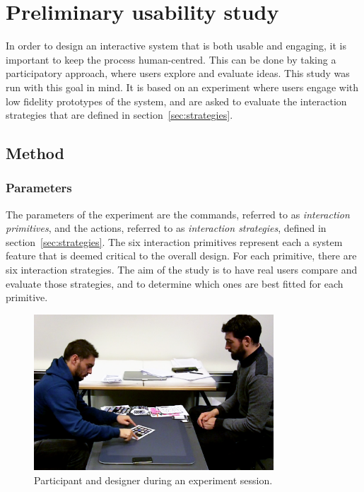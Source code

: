 \section{Preliminary usability study}

In order to design an interactive system that is both usable and engaging, it is important to keep the process human-centred.
This can be done by taking a participatory approach, where users explore and evaluate ideas.
This study was run with this goal in mind.
It is based on an experiment where users engage with low fidelity prototypes of the system, and are asked to evaluate the interaction strategies that are defined in section~\ref{sec:strategies}.

\subsection{Method}	

\subsubsection{Parameters}

The parameters of the experiment are the commands, referred to as \emph{interaction primitives}, and the actions, referred to as \emph{interaction strategies}, defined in section~\ref{sec:strategies}.
The six interaction primitives represent each a system feature that is deemed critical to the overall design.
For each primitive, there are six interaction strategies.
The aim of the study is to have real users compare and evaluate those strategies, and to determine which ones are best fitted for each primitive.

\begin{figure}[htb]
  \centering
    \includegraphics[width=0.8\textwidth]{images/studyScreenshot}
  \caption{Participant and designer during an experiment session.}
  \label{studyScreenshot}
\end{figure}

